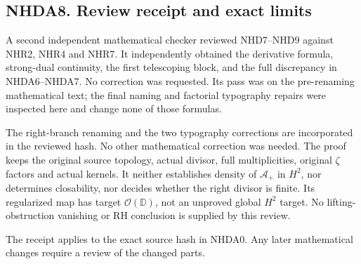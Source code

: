 \subsection{NHDA8. Review receipt and exact
limits}\label{nhda8.-review-receipt-and-exact-limits}

A second independent mathematical checker reviewed NHD7--NHD9 against
NHR2, NHR4 and NHR7. It independently obtained the derivative formula,
strong-dual continuity, the first telescoping block, and the full
discrepancy in NHDA6--NHDA7. No correction was requested. Its pass was
on the pre-renaming mathematical text; the final naming and factorial
typography repairs were inspected here and change none of those
formulas.

The right-branch renaming and the two typography corrections are
incorporated in the reviewed hash. No other mathematical correction was
needed. The proof keeps the original source topology, actual divisor,
full multiplicities, original \(\zeta\) factors and actual kernels. It
neither establishes density of \(\mathscr A_+\) in \(H^2\), nor
determines closability, nor decides whether the right divisor is finite.
Its regularized map has target \(\mathcal O(\mathbb D)\), not an
unproved global \(H^2\) target. No lifting-obstruction vanishing or RH
conclusion is supplied by this review.

The receipt applies to the exact source hash in NHDA0. Any later
mathematical changes require a review of the changed parts.
